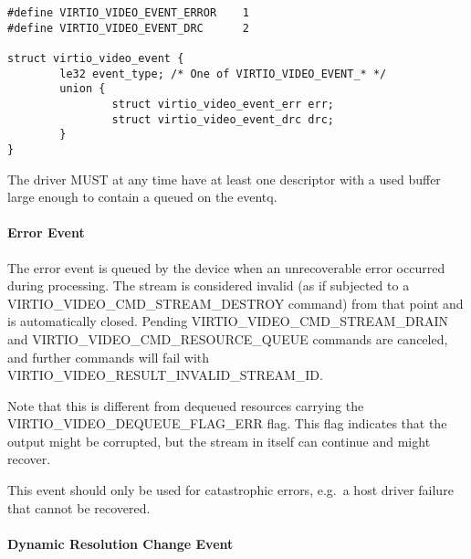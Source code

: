 \begin{lstlisting}
#define VIRTIO_VIDEO_EVENT_ERROR    1
#define VIRTIO_VIDEO_EVENT_DRC      2

struct virtio_video_event {
        le32 event_type; /* One of VIRTIO_VIDEO_EVENT_* */
        union {
                struct virtio_video_event_err err;
                struct virtio_video_event_drc drc;
        }
}
\end{lstlisting}


The driver MUST at any time have at least one descriptor with a used
buffer large enough to contain a 
queued on the eventq.

\paragraph{Error Event}\label{sec:Device Types / Video Device / Device Operation / Device Operation: Event Virtqueue / Error Event}

The error event is queued by the device when an unrecoverable error
occurred during processing. The stream is considered invalid (as if
subjected to a VIRTIO_VIDEO_CMD_STREAM_DESTROY command) from that
point and is automatically closed. Pending
VIRTIO_VIDEO_CMD_STREAM_DRAIN and
VIRTIO_VIDEO_CMD_RESOURCE_QUEUE commands are canceled, and further
commands will fail with VIRTIO_VIDEO_RESULT_INVALID_STREAM_ID.

Note that this is different from dequeued resources carrying the
VIRTIO_VIDEO_DEQUEUE_FLAG_ERR flag. This flag indicates that the
output might be corrupted, but the stream in itself can continue and
might recover.

This event should only be used for catastrophic errors, e.g.~a host
driver failure that cannot be recovered.

\paragraph{Dynamic Resolution Change Event}\label{sec:Device Types / Video Device / Device Operation / Device Operation: Event Virtqueue / Dynamic Resolution Change Event}

